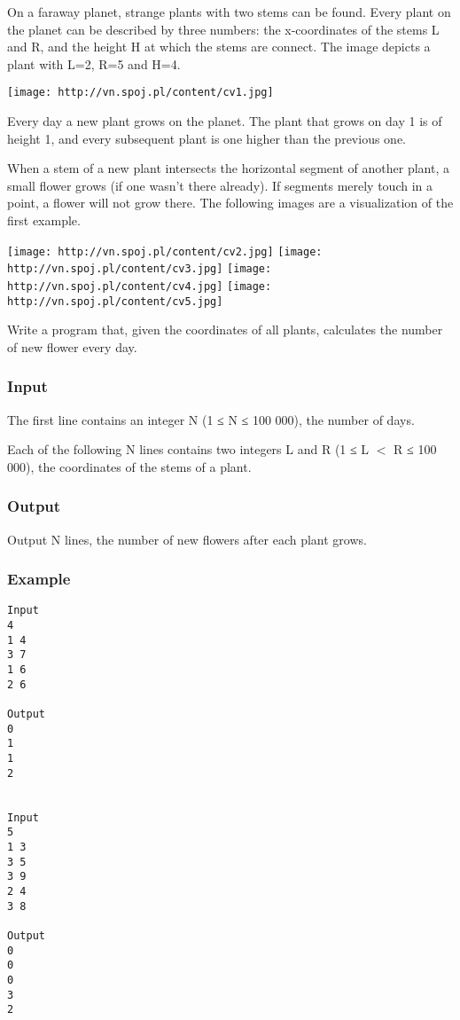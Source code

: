 



   On a faraway planet, strange plants with two stems can be found. Every plant on the planet can be described by three numbers: the x-coordinates of the stems L and R, and the height H at which the stems are connect. The image depicts a plant with L=2, R=5 and H=4.  


\texttt{[image: http://vn.spoj.pl/content/cv1.jpg]}

   Every day a new plant grows on the planet. The plant that grows on day 1 is of height 1, and every subsequent plant is one higher than the previous one.  

   When a stem of a new plant intersects the horizontal segment of another plant, a small flower grows (if one wasn't there already). If segments merely touch in a point, a flower will not grow there. The following images are a visualization of the first example.  


\texttt{[image: http://vn.spoj.pl/content/cv2.jpg]}
\texttt{[image: http://vn.spoj.pl/content/cv3.jpg]}
\texttt{[image: http://vn.spoj.pl/content/cv4.jpg]}
\texttt{[image: http://vn.spoj.pl/content/cv5.jpg]}

   Write a program that, given the coordinates of all plants, calculates the number of new flower every day.  

\subsubsection{   Input  }

   The first line contains an integer N (1 ≤ N ≤ 100 000), the number of days.  

   Each of the following N lines contains two integers L and R (1 ≤ L $<$ R ≤ 100 000), the coordinates of the stems of a plant.  

\subsubsection{   Output  }

   Output N lines, the number of new flowers after each plant grows.  

\subsubsection{   Example  }
\begin{verbatim}
Input
4
1 4
3 7
1 6
2 6

Output
0
1
1
2


Input
5
1 3
3 5
3 9
2 4
3 8

Output
0
0
0
3
2
\end{verbatim}